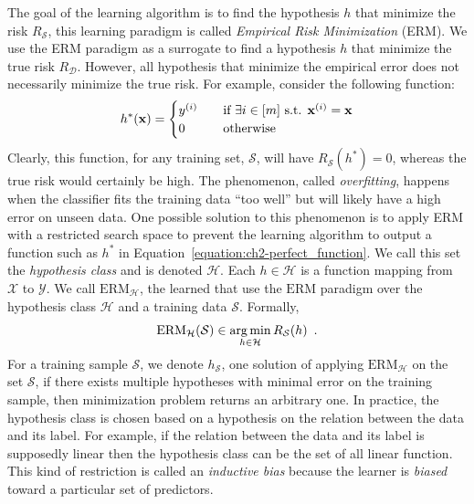 \noindent
The goal of the learning algorithm is to find the hypothesis $h$ that minimize the risk $R_{\mathcal{S}}$, this learning paradigm is called \emph{Empirical Risk Minimization} (ERM).
We use the ERM paradigm as a surrogate to find a hypothesis $h$ that minimize the true risk $R_\mathcal{D}$.
However, all hypothesis that minimize the empirical error does not necessarily minimize the true risk.
For example, consider the following function:
\begin{equation}
  h^*(\mathbf{x}) =
  \begin{cases}
    y^{(i)} &\quad \text{if }\exists i \in [m] \text{ s.t. } \mathbf{x}^{(i)} = \mathbf{x} \\
    0 &\quad \text{otherwise}
  \end{cases}
  \label{equation:ch2-perfect_function}
\end{equation}
Clearly, this function, for any training set, $\mathcal{S}$, will have $R_\mathcal{S}(h^*) = 0$, whereas the true risk would certainly be high.
The phenomenon, called \emph{overfitting}, happens when the classifier fits the training data ``too well'' but will likely have a high error on unseen data.
One possible solution to this phenomenon is to apply ERM with a restricted search space to prevent the learning algorithm to output a function such as $h^*$ in Equation~\ref{equation:ch2-perfect_function}.
We call this set the \emph{hypothesis class} and is denoted $\mathcal{H}$. 
Each $h \in \mathcal{H}$ is a function mapping from $\mathcal{X}$ to $\mathcal{Y}$.
We call $\mathrm{ERM}_{\mathcal{H}}$, the learned that use the $\mathrm{ERM}$ paradigm over the hypothesis class $\mathcal{H}$ and a training data $\mathcal{S}$.
Formally,
\begin{equation}
  \mathrm{ERM}_{\mathcal{H}}(\mathcal{S}) \in \operatorname*{arg\,min}_{h \in \mathcal{H}} R_{\mathcal{S}}(h) \enspace.
\end{equation}
For a training sample $\mathcal{S}$, we denote $h_\mathcal{S}$, one solution of applying $\text{ERM}_\mathcal{H}$ on the set $\mathcal{S}$, if there exists multiple hypotheses with minimal error on the training sample, then minimization problem returns an arbitrary one.
In practice, the hypothesis class is chosen based on a hypothesis on the relation between the data and its label.
For example, if the relation between the data and its label is supposedly linear then the hypothesis class can be the set of all linear function.
This kind of restriction is called an \emph{inductive bias} because the learner is \emph{biased} toward a particular set of predictors.

